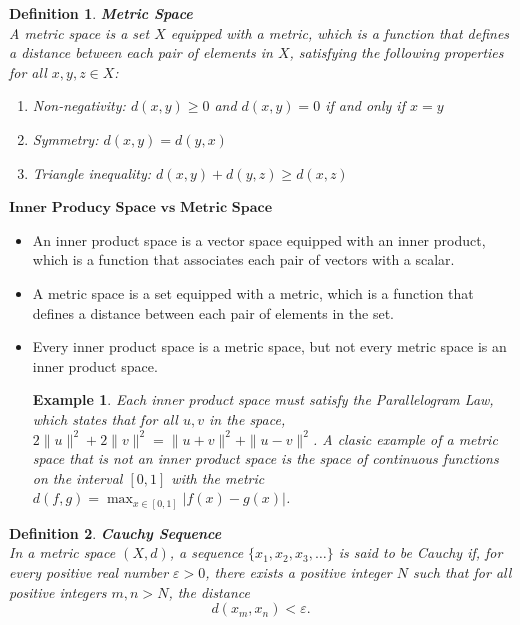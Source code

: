 \documentclass[11pt]{book} %
\newtheorem{definition}{Definition}[section]
\newtheorem*{example*}{Example}
\begin{document}
\begin{definition}{\textbf{Metric Space}} \\
    A metric space is a set \( X \) equipped with a metric, which is a function that defines a distance between each pair of elements in \( X \), satisfying the following properties for all \( x, y, z \in X \):
    \begin{enumerate}
        \item Non-negativity: \( d(x, y) \geq 0 \) and \( d(x, y) = 0 \) if and only if \( x = y \)
        \item Symmetry: \( d(x, y) = d(y, x) \)
        \item Triangle inequality: \( d(x, y) + d(y, z) \geq d(x, z) \)
    \end{enumerate}
    
\end{definition}

\( \textbf{Inner Producy Space vs Metric Space} \)
\begin{itemize}
    \item An inner product space is a vector space equipped with an inner product, which is a function that associates each pair of vectors with a scalar.
    \item A metric space is a set equipped with a metric, which is a function that defines a distance between each pair of elements in the set.
    \item Every inner product space is a metric space, but not every metric space is an inner product space.
        \begin{example*}
            Each inner product space must satisfy the Parallelogram Law, which states that for all \( u, v \) in the space, \( 2\|u\|^2 + 2\|v\|^2 = \|u + v\|^2 + \|u - v\|^2 \).
            A clasic example of a metric space that is not an inner product space is the space of continuous functions on the interval \([0, 1]\) with the metric \( d(f, g) = \max_{x \in [0, 1]} |f(x) - g(x)| \).
        \end{example*}
\end{itemize}

\begin{definition}{\textbf{Cauchy Sequence}} \\
    In a metric space \( (X, d) \), a sequence \( \{x_1, x_2, x_3, \ldots\} \) is said to be \emph{Cauchy} if, for every positive real number \( \varepsilon > 0 \), there exists a positive integer \( N \) such that for all positive integers \( m, n > N \), the distance
    \[ d(x_m, x_n) < \varepsilon. \]
\end{definition}
\end{document}
